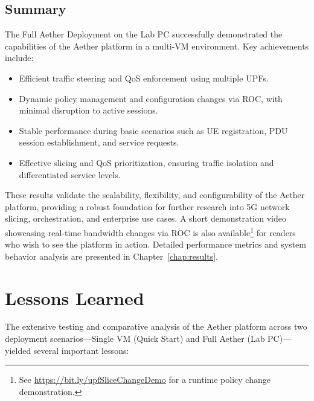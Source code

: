 \subsection{Summary}

The Full Aether Deployment on the Lab PC successfully demonstrated the capabilities of 
the Aether platform in a multi-VM environment. Key achievements include:

\begin{itemize}
    \item Efficient traffic steering and QoS enforcement using multiple UPFs.
    \item Dynamic policy management and configuration changes via ROC, with minimal 
          disruption to active sessions.
    \item Stable performance during basic scenarios such as UE registration, 
          PDU session establishment, and service requests.
    \item Effective slicing and QoS prioritization, ensuring traffic isolation and 
          differentiated service levels.
\end{itemize}

These results validate the scalability, flexibility, and configurability of the 
Aether platform, providing a robust foundation for further research into 5G network 
slicing, orchestration, and enterprise use cases. 
A short demonstration video showcasing real-time bandwidth changes via ROC is also 
available\footnote{See 
\url{https://bit.ly/upfSliceChangeDemo} 
for a runtime policy change demonstration.} 
for readers who wish to see the platform in action. Detailed performance metrics 
and system behavior analysis are presented in Chapter~\ref{chap:results}.




\section{Lessons Learned}
\label{sec:lessons-learned}

The extensive testing and comparative analysis of the Aether platform across two deployment scenarios—Single VM (Quick Start) and Full Aether (Lab PC)—yielded several important lessons:

